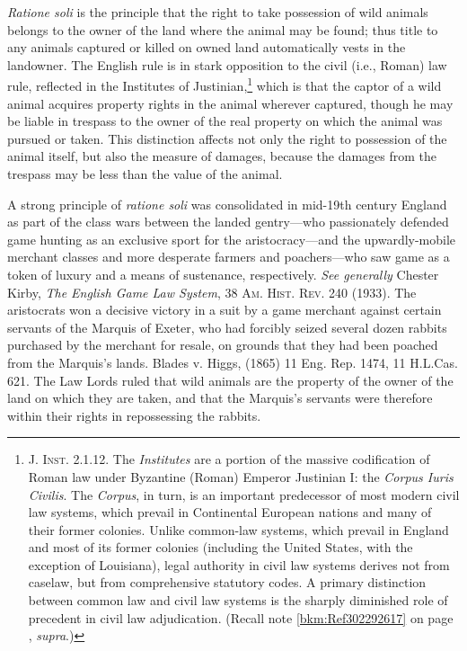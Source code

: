 

\textit{Ratione soli} is the principle that the right to take
possession of wild animals belongs to the owner of the land where the animal may
be found; thus title to any animals captured or killed on owned land
automatically vests in the landowner. The English rule is in stark opposition to
the civil (i.e., Roman) law rule, reflected in the Institutes of
Justinian,\footnote{\textsc{J. Inst.} 2.1.12. The \textit{Institutes} are a
portion of the massive codification of Roman law under Byzantine (Roman) Emperor
Justinian I: the \textit{Corpus Iuris Civilis}. The \textit{Corpus}, in turn, is
an important predecessor of most modern civil law systems, which prevail in
Continental European nations and many of their former colonies. Unlike
common-law systems, which prevail in England and most of its former colonies
(including the United States, with the exception of Louisiana), legal authority
in civil law systems derives not from caselaw, but from comprehensive statutory
codes. A primary distinction between common law and civil law systems is the
sharply diminished role of precedent in civil law adjudication. (Recall note
\ref{bkm:Ref302292617} on page \pageref{bkm:Ref302292617}, \textit{supra}.)}
which is that the captor of a wild animal acquires property rights in the animal
wherever captured, though he may be liable in trespass to the owner of the real
property on which the animal was pursued or taken. This distinction affects not
only the right to possession of the animal itself, but also the measure of
damages, because the damages from the trespass may be less than the value of the
animal.

A strong principle of \textit{ratione soli} was consolidated in mid-19th century
England as part of the class wars between the landed gentry---who passionately
defended game hunting as an exclusive sport for the aristocracy---and the
upwardly-mobile merchant classes and more desperate farmers and poachers---who
saw game as a token of luxury and a means of sustenance, respectively.
\textit{See generally} Chester Kirby, \emph{The English Game Law System}, 38
\textsc{Am. Hist. Rev.} 240 (1933). The aristocrats won a decisive victory in a
suit by a game merchant against certain servants of the Marquis of Exeter, who
had forcibly seized several dozen rabbits purchased by the merchant for resale,
on grounds that they had been poached from the Marquis's lands. Blades v. Higgs,
(1865) 11 Eng. Rep. 1474, 11 H.L.Cas. 621. The Law Lords ruled that wild animals
are the property of the owner of the land on which they are taken, and that the
Marquis's servants were therefore within their rights in repossessing the
rabbits.

